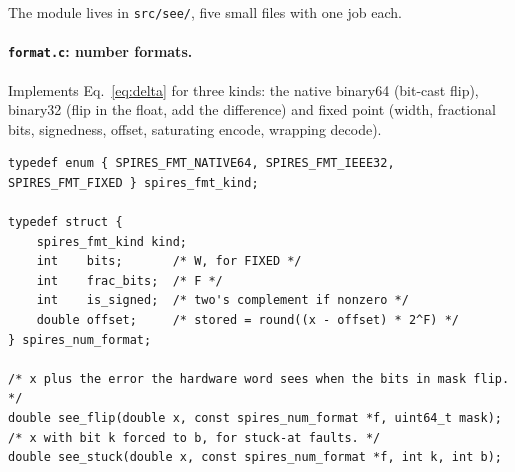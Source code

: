 \documentclass[11pt,a4paper]{article}
\begin{document}
The module lives in \texttt{src/see/}, five small files with one job each.

\paragraph{\texttt{format.c}: number formats.} Implements Eq.~\eqref{eq:delta} for three kinds: the native binary64 (bit-cast flip), binary32 (flip in the float, add the difference) and fixed point (width, fractional bits, signedness, offset, saturating encode, wrapping decode).
\begin{lstlisting}
typedef enum { SPIRES_FMT_NATIVE64, SPIRES_FMT_IEEE32, SPIRES_FMT_FIXED } spires_fmt_kind;

typedef struct {
    spires_fmt_kind kind;
    int    bits;       /* W, for FIXED */
    int    frac_bits;  /* F */
    int    is_signed;  /* two's complement if nonzero */
    double offset;     /* stored = round((x - offset) * 2^F) */
} spires_num_format;

/* x plus the error the hardware word sees when the bits in mask flip. */
double see_flip(double x, const spires_num_format *f, uint64_t mask);
/* x with bit k forced to b, for stuck-at faults. */
double see_stuck(double x, const spires_num_format *f, int k, int b);
\end{lstlisting}
\end{document}
